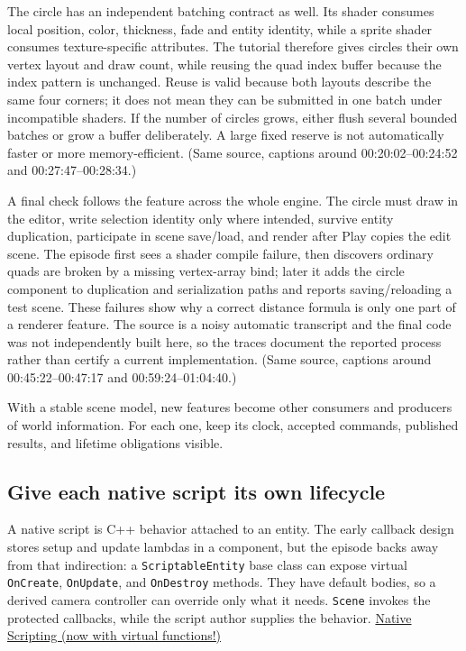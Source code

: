 The circle has an independent batching contract as well. Its shader consumes local position, color, thickness, fade and entity identity, while a sprite shader consumes texture-specific attributes. The tutorial therefore gives circles their own vertex layout and draw count, while reusing the quad index buffer because the index pattern is unchanged. Reuse is valid because both layouts describe the same four corners; it does not mean they can be submitted in one batch under incompatible shaders. If the number of circles grows, either flush several bounded batches or grow a buffer deliberately. A large fixed reserve is not automatically faster or more memory-efficient. (Same source, captions around 00:20:02--00:24:52 and 00:27:47--00:28:34.)

A final check follows the feature across the whole engine. The circle must draw in the editor, write selection identity only where intended, survive entity duplication, participate in scene save/load, and render after Play copies the edit scene. The episode first sees a shader compile failure, then discovers ordinary quads are broken by a missing vertex-array bind; later it adds the circle component to duplication and serialization paths and reports saving/reloading a test scene. These failures show why a correct distance formula is only one part of a renderer feature. The source is a noisy automatic transcript and the final code was not independently built here, so the traces document the reported process rather than certify a current implementation. (Same source, captions around 00:45:22--00:47:17 and 00:59:24--01:04:40.)

With a stable scene model, new features become other consumers and producers of world information. For each one, keep its clock, accepted commands, published results, and lifetime obligations visible.

\subsection{Give each native script its own lifecycle}\label{06-engine-ii-ch040-give-each-native-script-its-own-lifecycle}

\hypertarget{06-engine-ii-ch040-give-each-native-script-its-own-lifecycle}{}

A native script is C++ behavior attached to an entity. The early callback design stores setup and update lambdas in a component, but the episode backs away from that indirection: a \texttt{ScriptableEntity} base class can expose virtual \texttt{OnCreate}, \texttt{OnUpdate}, and \texttt{OnDestroy} methods. They have default bodies, so a derived camera controller can override only what it needs. \texttt{Scene} invokes the protected callbacks, while the script author supplies the behavior. \href{https://www.youtube.com/watch?v=1cHEcrIn8IQ}{Native Scripting (now with virtual functions!)}


